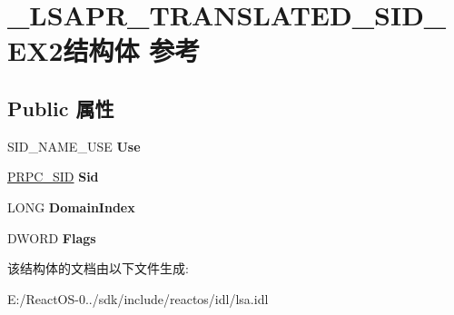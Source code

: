 \hypertarget{struct___l_s_a_p_r___t_r_a_n_s_l_a_t_e_d___s_i_d___e_x2}{}\section{\+\_\+\+L\+S\+A\+P\+R\+\_\+\+T\+R\+A\+N\+S\+L\+A\+T\+E\+D\+\_\+\+S\+I\+D\+\_\+\+E\+X2结构体 参考}
\label{struct___l_s_a_p_r___t_r_a_n_s_l_a_t_e_d___s_i_d___e_x2}
\subsection*{Public 属性}
\begin{DoxyCompactItemize}
\item 
\mbox{\label{struct___l_s_a_p_r___t_r_a_n_s_l_a_t_e_d___s_i_d___e_x2_a9597c753750a362474ed3f95fe8417b2}} 
S\+I\+D\+\_\+\+N\+A\+M\+E\+\_\+\+U\+SE {\bfseries Use}
\item 
\mbox{\label{struct___l_s_a_p_r___t_r_a_n_s_l_a_t_e_d___s_i_d___e_x2_aaef0a0a6b120ce32026bf404e313c3cc}} 
\hyperlink{struct___r_p_c___s_i_d}{P\+R\+P\+C\+\_\+\+S\+ID} {\bfseries Sid}
\item 
\mbox{\label{struct___l_s_a_p_r___t_r_a_n_s_l_a_t_e_d___s_i_d___e_x2_ae129b99c7357d11662c018f18b578d42}} 
L\+O\+NG {\bfseries Domain\+Index}
\item 
\mbox{\label{struct___l_s_a_p_r___t_r_a_n_s_l_a_t_e_d___s_i_d___e_x2_a57cfa4e1d38f1f5d0ff73aef5fc29f78}} 
D\+W\+O\+RD {\bfseries Flags}
\end{DoxyCompactItemize}


该结构体的文档由以下文件生成\+:\begin{DoxyCompactItemize}
\item 
E\+:/\+React\+O\+S-\/0../sdk/include/reactos/idl/lsa.\+idl\end{DoxyCompactItemize}
